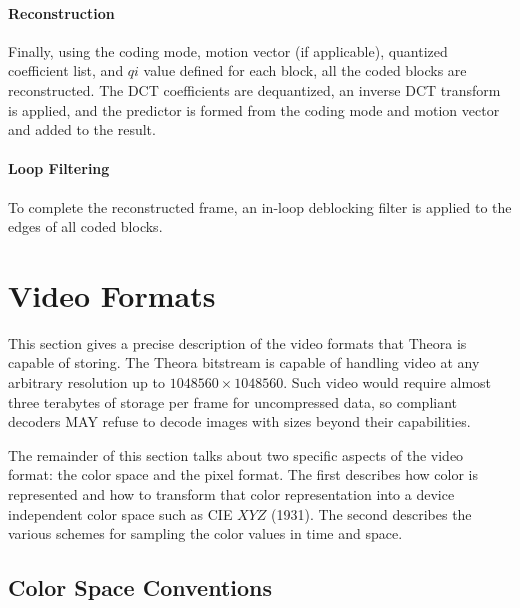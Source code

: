 \documentclass[11pt,letterpaper]{article}
\newcommand{\qi}{\ensuremath{\mathit{qi}} }
\begin{document}
\paragraph{Reconstruction}

Finally, using the coding mode, motion vector (if applicable), quantized
 coefficient list, and \qi value defined for each block, all the coded blocks
 are reconstructed.
The DCT coefficients are dequantized, an inverse DCT transform is applied, and
 the predictor is formed from the coding mode and motion vector and added to
 the result.

\paragraph{Loop Filtering}

To complete the reconstructed frame, an in-loop deblocking filter is applied to
 the edges of all coded blocks.

\section{Video Formats}

This section gives a precise description of the video formats that Theora is
 capable of storing.
The Theora bitstream is capable of handling video at any arbitrary resolution
 up to $1048560\times 1048560$.
Such video would require almost three terabytes of storage per frame for
 uncompressed data, so compliant decoders MAY refuse to decode images with
 sizes beyond their capabilities.

The remainder of this section talks about two specific aspects of the video
 format: the color space and the pixel format.
The first describes how color is represented and how to transform that color
 representation into a device independent color space such as CIE $XYZ$ (1931).
The second describes the various schemes for sampling the color values in time
 and space.

\subsection{Color Space Conventions}
\end{document}
